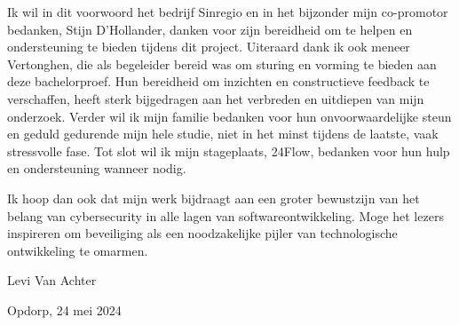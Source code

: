 Ik wil in dit voorwoord het bedrijf Sinregio en in het bijzonder mijn co-promotor bedanken, Stijn D'Hollander, danken voor zijn bereidheid om te helpen en ondersteuning te bieden  
tijdens dit project. Uiteraard dank ik ook meneer Vertonghen, die als begeleider bereid was om sturing en vorming te 
bieden aan deze bachelorproef. Hun bereidheid om inzichten en constructieve feedback te verschaffen, heeft sterk bijgedragen aan het verbreden en uitdiepen van mijn onderzoek.
Verder wil ik mijn familie bedanken voor hun onvoorwaardelijke steun en geduld gedurende mijn hele studie, niet in het minst tijdens de laatste, 
vaak stressvolle fase. Tot slot wil ik mijn stageplaats, 24Flow, bedanken voor hun hulp en ondersteuning wanneer nodig.

Ik hoop dan ook dat mijn werk bijdraagt aan een groter bewustzijn van het belang van cybersecurity in alle lagen van softwareontwikkeling. 
Moge het lezers inspireren om beveiliging als een noodzakelijke pijler van technologische ontwikkeling te omarmen.


Levi Van Achter

Opdorp, 24 mei 2024
